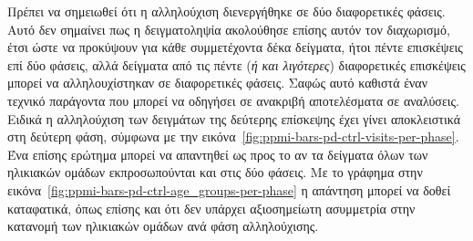 \documentclass[12pt]{report}
\begin{document}
        \par
            Πρέπει να σημειωθεί ότι η αλληλούχιση διενεργήθηκε σε δύο διαφορετικές φάσεις. Αυτό δεν σημαίνει πως η δειγματοληψία ακολούθησε επίσης αυτόν τον διαχωρισμό, έτσι ώστε να προκύψουν για κάθε συμμετέχοντα δέκα δείγματα, ήτοι πέντε επισκέψεις επί δύο φάσεις, αλλά δείγματα από τις πέντε (\emph{ή και λιγότερες}) διαφορετικές επισκέψεις μπορεί να αλληλουχίστηκαν σε διαφορετικές φάσεις. Σαφώς αυτό καθιστά έναν τεχνικό παράγοντα που μπορεί να οδηγήσει σε ανακριβή αποτελέσματα σε αναλύσεις. Ειδικά η αλληλούχιση των δειγμάτων της δεύτερης επίσκεψης έχει γίνει αποκλειστικά στη δεύτερη φάση, σύμφωνα με την εικόνα~\ref{fig:ppmi-bars-pd-ctrl-visits-per-phase}. Ένα επίσης ερώτημα μπορεί να απαντηθεί ως προς το αν τα δείγματα όλων των ηλικιακών ομάδων εκπροσωπούνται και στις δύο φάσεις. Με το γράφημα στην εικόνα~\ref{fig:ppmi-bars-pd-ctrl-age_groups-per-phase} η απάντηση μπορεί να δοθεί καταφατικά, όπως επίσης και ότι δεν υπάρχει αξιοσημείωτη ασυμμετρία στην κατανομή των ηλικιακών ομάδων ανά φάση αλληλούχισης.
\end{document}
